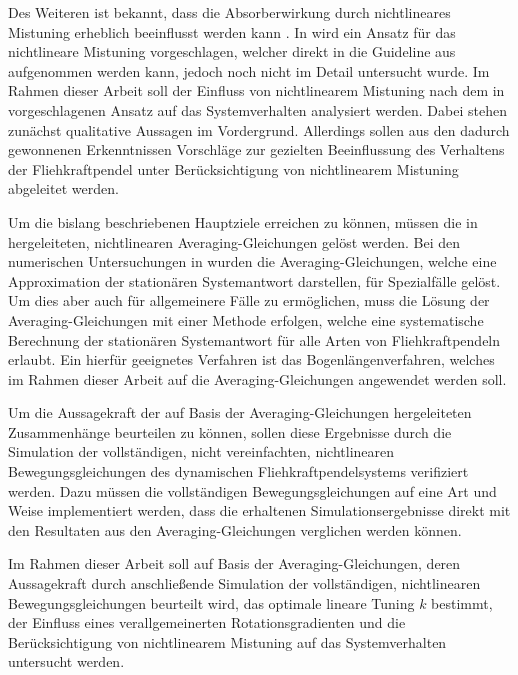 Des Weiteren ist bekannt, dass die Absorberwirkung durch nichtlineares Mistuning 
erheblich beeinflusst werden kann \cite{Mayet:CPVAMitMistuning}. 
In \cite{Mayet:CPVAMitMistuning} wird ein Ansatz für das nichtlineare Mistuning vorgeschlagen,
welcher direkt in die Guideline aus \cite{Mayet:Tautochronic} aufgenommen werden kann,
jedoch noch nicht im Detail untersucht wurde.
Im Rahmen dieser Arbeit soll der Einfluss von nichtlinearem Mistuning nach dem 
in \cite{Mayet:CPVAMitMistuning} vorgeschlagenen Ansatz auf das Systemverhalten analysiert werden.
Dabei stehen zunächst qualitative Aussagen im Vordergrund. Allerdings sollen
aus den dadurch gewonnenen Erkenntnissen Vorschläge zur gezielten Beeinflussung
des Verhaltens der Fliehkraftpendel unter Berücksichtigung von nichtlinearem Mistuning
abgeleitet werden.




Um die bislang beschriebenen Hauptziele erreichen zu können, müssen die
in  \cite{Mayet:Tautochronic} hergeleiteten, nichtlinearen Averaging-Gleichungen gelöst werden.
Bei den numerischen Untersuchungen in \cite{Mayet:Tautochronic} wurden
die Averaging-Gleichungen, welche eine Approximation der stationären Systemantwort 
darstellen, für Spezialfälle gelöst.
Um dies aber auch für allgemeinere Fälle zu ermöglichen, muss die Lösung
der Averaging-Gleichungen mit einer Methode erfolgen, welche eine systematische Berechnung 
der stationären Systemantwort für alle Arten von Fliehkraftpendeln erlaubt.
Ein hierfür geeignetes Verfahren ist das Bogenlängenverfahren, welches im
Rahmen dieser Arbeit auf die Averaging-Gleichungen angewendet werden soll.

Um die Aussagekraft der auf Basis der Averaging-Gleichungen hergeleiteten Zusammenhänge
beurteilen zu können, sollen diese Ergebnisse durch die  Simulation der 
vollständigen, nicht vereinfachten, nichtlinearen Bewegungsgleichungen des
dynamischen Fliehkraftpendelsystems verifiziert werden. 
Dazu müssen die vollständigen Bewegungsgleichungen auf eine Art und Weise implementiert werden,
dass die erhaltenen Simulationsergebnisse direkt mit den 
Resultaten aus den Averaging-Gleichungen verglichen werden können.


Im Rahmen dieser Arbeit soll auf Basis der Averaging-Gleichungen, deren
Aussagekraft durch anschließende Simulation der vollständigen, nichtlinearen Bewegungsgleichungen
beurteilt wird, das optimale lineare Tuning $k$ bestimmt,
der Einfluss eines verallgemeinerten Rotationsgradienten und die Berücksichtigung von 
nichtlinearem Mistuning auf das Systemverhalten untersucht werden. 









